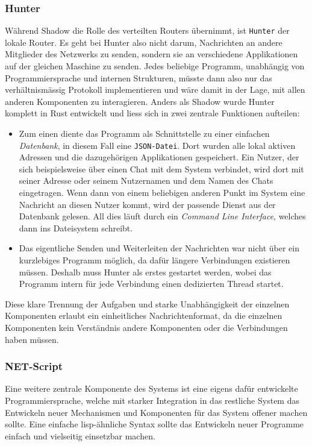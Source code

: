 \documentclass[11pt]{article}
\begin{document}
\subsubsection{Hunter}
\label{sec:orga7dd7b8}
Während Shadow die Rolle des verteilten Routers übernimmt, ist \texttt{Hunter}
der lokale Router. Es geht bei Hunter also nicht darum, Nachrichten an
andere Mitglieder des Netzwerks zu senden, sondern sie an verschiedene
Applikationen auf der gleichen Maschine zu senden. Jedes beliebige
Programm, unabhängig von Programmiersprache und internen Strukturen,
müsste dann also nur das verhältnismässig Protokoll implementieren und
wäre damit in der Lage, mit allen anderen Komponenten zu interagieren.
Anders als Shadow wurde Hunter komplett in Rust entwickelt und liess
sich in zwei zentrale Funktionen aufteilen:
\begin{itemize}
\item Zum einen diente das Programm als Schnittstelle zu einer einfachen
\emph{Datenbank}, in diesem Fall eine \texttt{JSON-Datei}. Dort wurden alle lokal
aktiven Adressen und die dazugehörigen Applikationen gespeichert.
Ein Nutzer, der sich beispielsweise über einen Chat mit dem System
verbindet, wird dort mit seiner Adresse oder seinem Nutzernamen und
dem Namen des Chats eingetragen. Wenn dann von einem beliebigen
anderen Punkt im System eine Nachricht an diesen Nutzer kommt, wird
der passende Dienst aus der Datenbank gelesen. All dies läuft durch
ein \emph{Command Line Interface}, welches dann ins Dateisystem schreibt.
\item Das eigentliche Senden und Weiterleiten der Nachrichten war nicht
über ein kurzlebiges Programm möglich, da dafür längere Verbindungen
existieren müssen. Deshalb muss Hunter als erstes gestartet werden,
wobei das Programm intern für jede Verbindung einen dedizierten
Thread startet.
\end{itemize}

\noindent Diese klare Trennung der Aufgaben und starke Unabhängigkeit
der einzelnen Komponenten erlaubt ein einheitliches Nachrichtenformat,
da die einzelnen Komponenten kein Verständnis andere Komponenten oder
die Verbindungen haben müssen.
\subsubsection{NET-Script}
\label{sec:org78674b8}
Eine weitere zentrale Komponente des Systems ist eine eigens dafür
entwickelte Programmiersprache, welche mit starker Integration in das
restliche System das Entwickeln neuer Mechanismen und Komponenten für
das System offener machen sollte. Eine einfache lisp-ähnliche Syntax
sollte das Entwickeln neuer Programme einfach und vielseitig
einsetzbar machen.
\end{document}
